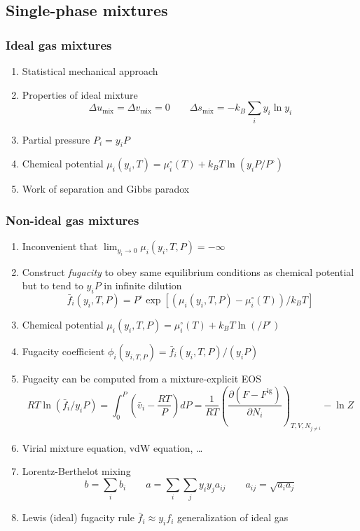 \documentclass[11pt]{article}
\begin{document}
\subsection{Single-phase mixtures}
\label{sec:org02ced68}
\subsubsection{Ideal gas mixtures}
\label{sec:org8aac7ce}
\begin{enumerate}
\item Statistical mechanical approach
\item Properties of ideal mixture
\begin{equation*}
  \Delta u_\text{mix} = \Delta v_\text{mix} = 0 \qquad \Delta s_\text{mix} = - k_B \sum_i y_i \ln y_i
\end{equation*}
\item Partial pressure \(P_i = y_i P\)
\item Chemical potential \(\mu_i(y_i,T) = \mu_i^\circ(T) + k_B T \ln \left ( y_i
              P/P^\circ \right)\)
\item Work of separation and Gibbs paradox
\end{enumerate}

\subsubsection{Non-ideal gas mixtures}
\label{sec:orgcf43871}
\begin{enumerate}
\item Inconvenient that \(\lim_{y_{i}\to 0}\mu_i(y_i,T,P) = -\infty\)
\item Construct \emph{fugacity} to obey same equilibrium conditions as chemical potential but to tend to \(y_{i}P\) in infinite dilution
\begin{equation*}
  \bar{f}_i(y_{i},T,P) = P^{\circ} \exp \left [ (\mu_i(y_i,T,P) - \mu_i^\circ(T))/ k_B T \right ]
\end{equation*}
\item Chemical potential \(\mu_i(y_i,T,P) = \mu_i^\circ(T) + k_B T \ln \left ( /P^\circ \right)\)
\item Fugacity coefficient \(\phi_{i}(y_{i,T,P})=\bar{f}_{i}(y_{i},T,P)/(y_{i}P)\)
\item Fugacity can be computed from a mixture-explicit EOS
\begin{equation*}
	    R T \ln \left ( \bar{f}_i/y_i P \right ) = \int_0^P \left (
      \bar{v}_i - \frac{RT}{P} \right ) dP  =  \frac{1}{RT} \left ( \frac{\partial (F - F^\text{ig})}{\partial N_i} \right )_{T,V,N_{j\neq i}} - \ln Z
 \end{equation*}
\item Virial mixture equation, vdW equation, \ldots
\item Lorentz-Berthelot mixing
\begin{equation*}
  b = \sum_i b_i \qquad a = \sum_i\sum_j y_i y_j a_{ij} \qquad a_{ij} = \sqrt{a_ia_j}
\end{equation*}
\item Lewis (ideal) fugacity rule \(\bar{f}_i \approx y_i f_i\) generalization of ideal gas
\end{enumerate}
\end{document}
